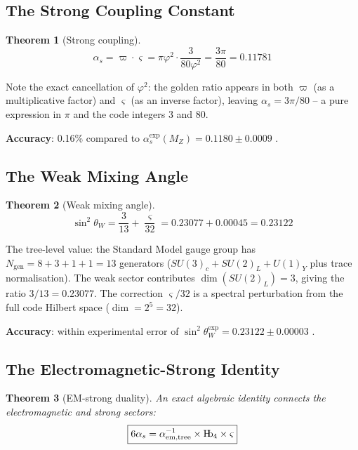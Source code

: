 \documentclass[11pt,a4paper]{article}
\newtheorem{theorem}{Theorem}[section]
\theoremstyle{definition}
\newcommand{\Hb}{\textnormal{H\kern-0.3em b}}
\newcommand{\Hbfour}{\Hb_4}
\newcommand{\strain}{\varsigma}
\newcommand{\specbond}{\varpi}
\begin{document}
\subsection{The Strong Coupling Constant}

\begin{theorem}[Strong coupling]
\label{thm:alpha_s}
\begin{equation}
\boxed{\alpha_s = \specbond \cdot \strain = \pi\varphi^2 \cdot \frac{3}{80\varphi^2} = \frac{3\pi}{80} = 0.11781}
\label{eq:alpha_s}
\end{equation}
\end{theorem}

Note the exact cancellation of $\varphi^2$: the golden ratio appears in both $\specbond$ (as a multiplicative factor) and $\strain$ (as an inverse factor), leaving $\alpha_s = 3\pi/80$ -- a pure expression in $\pi$ and the code integers 3 and 80.

\textbf{Accuracy}: 0.16\% compared to $\alpha_s^{\text{exp}}(M_Z) = 0.1180 \pm 0.0009$ \cite{PDG2022}.

\subsection{The Weak Mixing Angle}

\begin{theorem}[Weak mixing angle]
\label{thm:sin2theta}
\begin{equation}
\sin^2\theta_W = \frac{3}{13} + \frac{\strain}{32} = 0.23077 + 0.00045 = 0.23122
\label{eq:sin2theta}
\end{equation}
\end{theorem}

The tree-level value: the Standard Model gauge group has $N_{\text{gen}} = 8 + 3 + 1 + 1 = 13$ generators ($SU(3)_c + SU(2)_L + U(1)_Y$ plus trace normalisation). The weak sector contributes $\dim(SU(2)_L) = 3$, giving the ratio $3/13 = 0.23077$. The correction $\strain/32$ is a spectral perturbation from the full code Hilbert space ($\dim = 2^5 = 32$).

\textbf{Accuracy}: within experimental error of $\sin^2\theta_W^{\text{exp}} = 0.23122 \pm 0.00003$ \cite{PDG2022}.

\subsection{The Electromagnetic-Strong Identity}

\begin{theorem}[EM-strong duality]
\label{thm:em_strong}
An exact algebraic identity connects the electromagnetic and strong sectors:
\begin{equation}
\boxed{6\alpha_s = \alpha^{-1}_{\text{em,tree}} \times \Hbfour \times \strain}
\label{eq:em_strong}
\end{equation}
\end{theorem}
\end{document}
